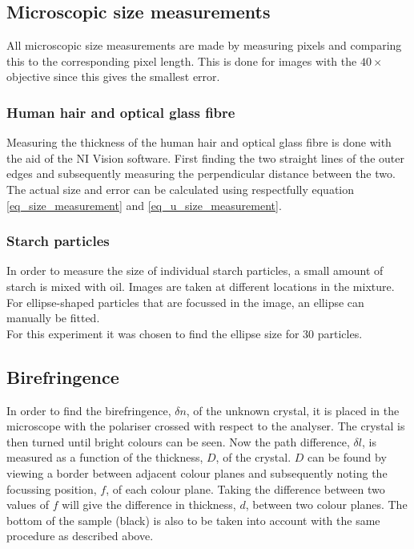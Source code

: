 \subsection{Microscopic size measurements}

All microscopic size measurements are made by measuring pixels and comparing this to the corresponding pixel length. This is done for images with the $40\times$ objective since this gives the smallest error.\\

\subsubsection{Human hair and optical glass fibre}

Measuring the thickness of the human hair and optical glass fibre is done with the aid of the NI Vision software. First finding the two straight lines of the outer edges and subsequently measuring the perpendicular distance between the two. The actual size and error can be calculated using respectfully equation \ref{eq_size_measurement} and \ref{eq_u_size_measurement}.

\subsubsection{Starch particles}

In order to measure the size of individual starch particles, a small amount of starch is mixed with oil. Images are taken at different locations in the mixture. For ellipse-shaped particles that are focussed in the image, an ellipse can manually be fitted.\\

For this experiment it was chosen to find the ellipse size for 30 particles.\\


\subsection{Birefringence}

In order to find the birefringence, $\delta n$, of the unknown crystal, it is placed in the microscope with the polariser crossed with respect to the analyser. The crystal is then turned until bright colours can be seen. Now the path difference, $\delta l$, is measured as a function of the thickness, $D$, of the crystal. $D$ can be found by viewing a border between adjacent colour planes and subsequently noting the focussing position, $f$, of each colour plane. Taking the difference between two values of $f$ will give the difference in thickness, $d$, between two colour planes. The bottom of the sample (black) is also to be taken into account with the same procedure as described above. \\

